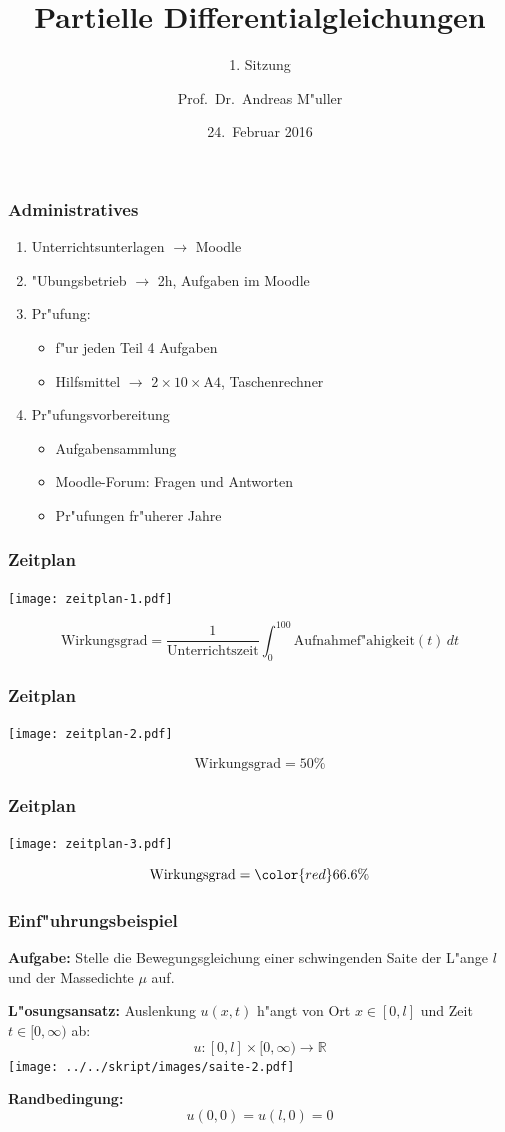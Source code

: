 \documentclass{beamer}
\title[]{Partielle Differentialgleichungen}
\subtitle{1. Sitzung}
\date[24.~Februar 2016]{24.~Februar 2016}
\author{Prof.~Dr.~Andreas M"uller}
\begin{document}
\begin{frame}
\titlepage
\end{frame}

\begin{frame}
\frametitle{Administratives}
\begin{enumerate}
\item Unterrichtsunterlagen $\to$ Moodle
\item "Ubungsbetrieb $\to$ 2h, Aufgaben im Moodle
\item Pr"ufung:
\begin{itemize}
\item f"ur jeden Teil 4 Aufgaben
\item Hilfsmittel $\to$ $2\times 10\times \text{A4}$, Taschenrechner
\end{itemize}
\item Pr"ufungsvorbereitung
\begin{itemize}
\item Aufgabensammlung
\item Moodle-Forum: Fragen und Antworten
\item Pr"ufungen fr"uherer Jahre
\end{itemize}
\end{enumerate}
\end{frame}

\begin{frame}
\frametitle{Zeitplan}
\begin{center}
\texttt{[image: zeitplan-1.pdf]}
\end{center}
\[
\text{Wirkungsgrad}
=
\frac{1}{\text{Unterrichtszeit}}
\int_0^{100}\text{Aufnahmef"ahigkeit}(t)\,dt
\]
\end{frame}

\begin{frame}
\frametitle{Zeitplan}
\begin{center}
\texttt{[image: zeitplan-2.pdf]}
\end{center}
\[
\text{Wirkungsgrad}= 50\%
\]
\end{frame}

\begin{frame}
\frametitle{Zeitplan}
\begin{center}
\texttt{[image: zeitplan-3.pdf]}
\end{center}
\[
\text{Wirkungsgrad}= \color{red}66.6\%
\]
\end{frame}

\begin{frame}
\frametitle{Einf"uhrungsbeispiel}

{\bf Aufgabe:} Stelle die Bewegungsgleichung
einer schwingenden Saite der L"ange $l$ und der Massedichte $\mu$ auf.

\medskip
\pause
{\bf L"osungsansatz:}
Auslenkung $ u(x,t)$ h"angt von Ort $x\in[0,l]$ und Zeit $t\in[0,\infty)$
ab:
\[
u\colon [0,l]\times [0,\infty)\to \mathbb R
\]
\pause
\medskip
\texttt{[image: ../../skript/images/saite-2.pdf]}
\pause
\medskip

{\bf Randbedingung:}
\[
u(0,0)= u(l,0)=0
\]
\end{frame}
\end{document}
